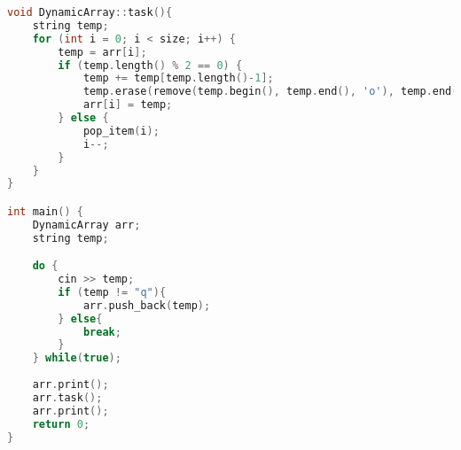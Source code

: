 \documentclass[a4paper,12pt]{article}
\begin{document}
\newpage
    \begin{lstlisting}[language=C++]
void DynamicArray::task(){
    string temp;
    for (int i = 0; i < size; i++) {
        temp = arr[i];
        if (temp.length() % 2 == 0) {
            temp += temp[temp.length()-1];
            temp.erase(remove(temp.begin(), temp.end(), 'o'), temp.end());
            arr[i] = temp;
        } else {
            pop_item(i);
            i--;
        }
    }
}        

int main() {
    DynamicArray arr;
    string temp;

    do {
        cin >> temp;
        if (temp != "q"){
            arr.push_back(temp);
        } else{
            break;
        }
    } while(true);
    
    arr.print();
    arr.task();
    arr.print();
    return 0;
}
    \end{lstlisting}
\end{document}
